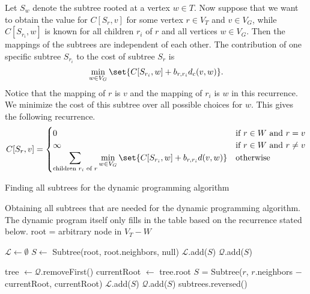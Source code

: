 Let $S_w$ denote the subtree rooted at a vertex $w \in T$.
Now suppose that we want to obtain the value for $C[S_r, v]$ for some vertex $r \in V_T$ and $v \in V_G$, while $C[S_{r_i}, w]$ is known for all children $r_i$ of $r$ and all vertices $w \in V_G$.
Then the mappings of the subtrees are independent of each other.
The contribution of one specific subtree $S_{r_i}$ to the cost of subtree $S_r$ is
\[
    \min_{w \in V_G} \set{C[S_{r_i}, w] + b_{r, r_i} d_c(v, w)}.
\]
Notice that the mapping of $r$ is $v$ and the mapping of $r_i$ is $w$ in this recurrence.
We minimize the cost of this subtree over all possible choices for $w$.
This gives the following recurrence.
\[
    C[S_r, v] = \begin{cases}
                  0 &\text{if $r \in W$ and $r = v$} \\
                  \infty &\text{if $r \in W$ and $r \neq v$} \\
                  \displaystyle \sum_{\text{children $r_i$ of $r$}} \min_{w \in V_G} \set{ C[S_{r_i}, w] + b_{r, r_i} d(v, w) } &\text{otherwise} \\
    \end{cases}
\]

\begin{algorithm}[t]
    \caption{Finding all subtrees for the dynamic programming algorithm}
    \label{alg:subtrees}
    \begin{algorithmic}[1]
        \Statex Obtaining all subtrees that are needed for the dynamic programming algorithm.
        The dynamic program itself only fills in the table based on the recurrence stated below.
            \State root = arbitrary node in $V_T - W$

            \State $\mathcal L \gets \emptyset$
            \State $S \gets$ Subtree(root, root.neighbors, null) 
            \State $\mathcal L$.add($S$)
            \State $\mathcal Q$.add($S$)

                \State tree $\gets \mathcal Q$.removeFirst()
                \State currentRoot $\gets$ tree.root
                    \State $S$ = Subtree($r$, $r$.neighbors $-$ currentRoot, currentRoot)
                    \State $\mathcal L$.add($S$)
                    \State $\mathcal Q$.add($S$)
                \EndFor
            \EndWhile
            \State \Return subtrees.reversed()
        \EndProcedure
    \end{algorithmic}
\end{algorithm}

